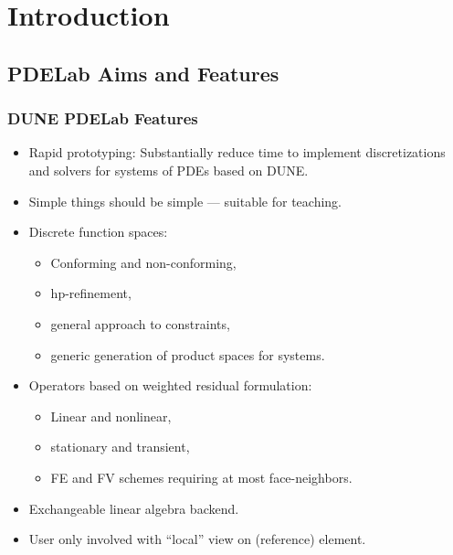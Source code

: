 \section{Introduction}

\subsection{PDELab Aims and Features}

\begin{frame}
\frametitle<presentation>{DUNE PDELab Features}
\begin{itemize}
\item Rapid prototyping: Substantially reduce time to implement
discretizations and solvers for systems of PDEs based on DUNE.
\item Simple things should be simple --- suitable for teaching.
\item Discrete function spaces:
\begin{itemize}
\item Conforming and non-conforming,
\item hp-refinement,
\item general approach to constraints,
\item generic generation of product spaces for systems.
\end{itemize} 
\item Operators based on weighted residual formulation:
\begin{itemize}
\item Linear and nonlinear,
\item stationary and transient,
\item FE and FV schemes requiring at most face-neighbors.
\end{itemize} 
\item Exchangeable linear algebra backend. 
\item User only involved with ``local'' view on (reference) element.
\end{itemize}
\end{frame}

